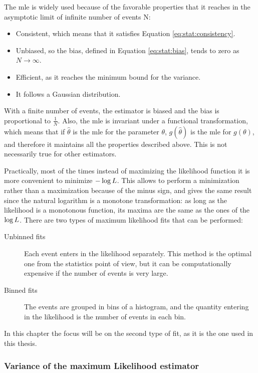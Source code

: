 The \gls{mle} is widely used because of the favorable properties that it reaches in the asymptotic limit of infinite number of events N:
\begin{itemize}
\item Consistent, which means that it satisfies Equation \ref{eq:stat:consistency}.
\item Unbiased, so the bias, defined in Equation \ref{eq:stat:bias}, tends to zero as $N \rightarrow \infty$.
\item Efficient, as it reaches the minimum bound for the variance.
\item It follows a Gaussian distribution.
\end{itemize}

\noindent With a finite number of events, the estimator is biased and the bias is proportional to $\frac{1}{N}$. Also, the \gls{mle} is invariant under a functional transformation, which means that if $\hat{\theta}$ is the \gls{mle} for the parameter $\theta$, $g(\hat{\theta})$ is the \gls{mle} for $g(\theta)$, and therefore it maintains all the properties described above. This is not necessarily true for other estimators.

Practically, most of the times instead of maximizing the likelihood function it is more convenient to minimize $-\log{L}$. 
This allows to perform a minimization rather than a maximization because of the minus sign,
and gives the same result since the natural logarithm is a monotone transformation: 
as long as the likelihood is a monotonous function, its maxima are the same as the ones of the $\log{L}$.
There are two types of maximum likelihood fits that can be performed:

\begin{description}
\item[Unbinned fits] Each event enters in the likelihood separately. This method is the optimal one from the statistics point of view, but it can be computationally expensive if the number of events is very large.
\item[Binned fits] The events are grouped in bins of a histogram, and the quantity entering in the likelihood is the number of events in each bin.
\end{description}

\noindent In this chapter the focus will be on the second type of fit, as it is the one used in this thesis.

\subsubsection*{Variance of the maximum Likelihood estimator}

